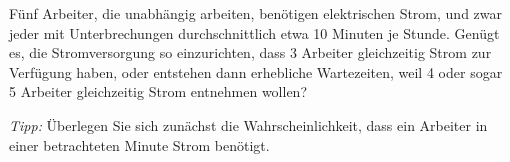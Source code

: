 \documentclass{abgabe}
\begin{document}
\begin{questions}
    \question
    Fünf Arbeiter, die unabhängig arbeiten, benötigen elektrischen Strom, und zwar jeder mit Unterbrechungen durchschnittlich etwa 10 Minuten je Stunde. 
    Genügt es, die Stromversorgung so einzurichten, dass 3 Arbeiter gleichzeitig Strom zur Verfügung haben, oder entstehen dann erhebliche Wartezeiten, weil 4 oder sogar 5 Arbeiter gleichzeitig Strom entnehmen wollen?
    
    \emph{Tipp:} Überlegen Sie sich zunächst die Wahrscheinlichkeit, dass ein Arbeiter in einer betrachteten Minute Strom benötigt.
    \begin{solution}

    \end{solution}
\end{questions}
\end{document}
